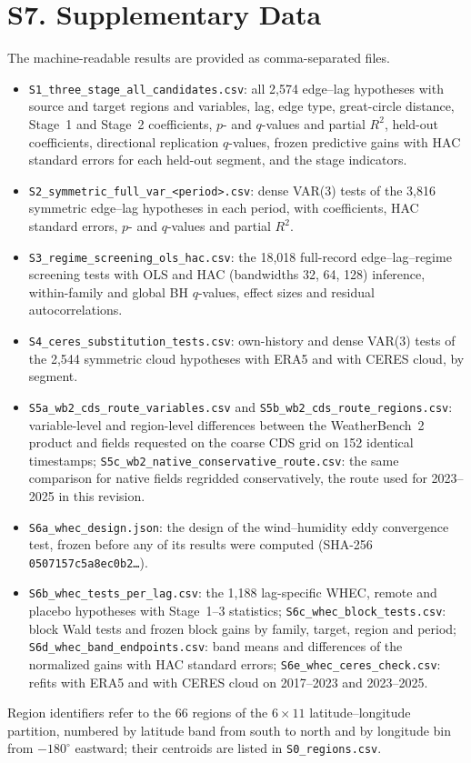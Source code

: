\documentclass[11pt]{article}
\begin{document}
\section*{S7. Supplementary Data}
The machine-readable results are provided as comma-separated files.
\begin{itemize}
\item \texttt{S1\_three\_stage\_all\_candidates.csv}: all 2,574 edge--lag hypotheses with source and target regions and variables, lag, edge type, great-circle distance, Stage~1 and Stage~2 coefficients, $p$- and $q$-values and partial $R^2$, held-out coefficients, directional replication $q$-values, frozen predictive gains with HAC standard errors for each held-out segment, and the stage indicators.
\item \texttt{S2\_symmetric\_full\_var\_<period>.csv}: dense VAR(3) tests of the 3,816 symmetric edge--lag hypotheses in each period, with coefficients, HAC standard errors, $p$- and $q$-values and partial $R^2$.
\item \texttt{S3\_regime\_screening\_ols\_hac.csv}: the 18,018 full-record edge--lag--regime screening tests with OLS and HAC (bandwidths 32, 64, 128) inference, within-family and global BH $q$-values, effect sizes and residual autocorrelations.
\item \texttt{S4\_ceres\_substitution\_tests.csv}: own-history and dense VAR(3) tests of the 2,544 symmetric cloud hypotheses with ERA5 and with CERES cloud, by segment.
\item \texttt{S5a\_wb2\_cds\_route\_variables.csv} and \texttt{S5b\_wb2\_cds\_route\_regions.csv}: variable-level and region-level differences between the WeatherBench~2 product and fields requested on the coarse CDS grid on 152 identical timestamps; \texttt{S5c\_wb2\_native\_conservative\_route.csv}: the same comparison for native fields regridded conservatively, the route used for 2023--2025 in this revision.
\item \texttt{S6a\_whec\_design.json}: the design of the wind--humidity eddy convergence test, frozen before any of its results were computed (SHA-256 \texttt{0507157c5a8ec0b2\ldots}).
\item \texttt{S6b\_whec\_tests\_per\_lag.csv}: the 1,188 lag-specific WHEC, remote and placebo hypotheses with Stage~1--3 statistics; \texttt{S6c\_whec\_block\_tests.csv}: block Wald tests and frozen block gains by family, target, region and period; \texttt{S6d\_whec\_band\_endpoints.csv}: band means and differences of the normalized gains with HAC standard errors; \texttt{S6e\_whec\_ceres\_check.csv}: refits with ERA5 and with CERES cloud on 2017--2023 and 2023--2025.
\end{itemize}
Region identifiers refer to the 66 regions of the $6\times11$ latitude--longitude partition, numbered by latitude band from south to north and by longitude bin from $-180^\circ$ eastward; their centroids are listed in \texttt{S0\_regions.csv}.
\end{document}

